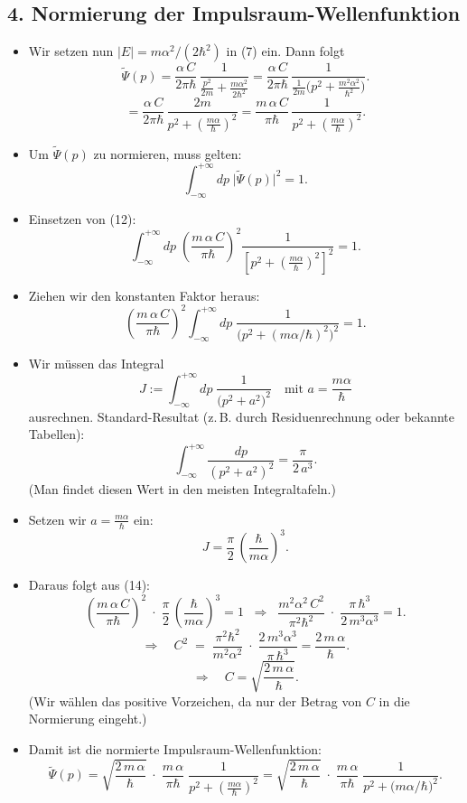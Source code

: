 \documentclass[12pt,a4paper]{scrartcl}
\begin{document}
\subsection*{4. Normierung der Impulsraum-Wellenfunktion}

\begin{itemize}
  \item Wir setzen nun $|E| = m\alpha^2/(2\hbar^2)$ in (7) ein. Dann folgt
  \[
    \widetilde\Psi(p) 
    = \frac{\alpha\,C}{2\pi\hbar}\,\frac{1}{\frac{p^2}{2m} + \frac{m\alpha^2}{2\hbar^2}}
    = \frac{\alpha\,C}{2\pi\hbar}\,\frac{1}{\frac{1}{2m}\bigl(p^2 + \tfrac{m^2\alpha^2}{\hbar^2}\bigr)}.
  \]
  \[
    = \frac{\alpha\,C}{2\pi\hbar}\,\frac{2m}{p^2 + \left(\frac{m\alpha}{\hbar}\right)^2}
    = \frac{m\,\alpha\,C}{\pi\hbar}\,\frac{1}{p^2 + \left(\frac{m\alpha}{\hbar}\right)^2}.
    \tag{12}
  \]
  \item Um $\widetilde\Psi(p)$ zu normieren, muss gelten:
  \[
    \int_{-\infty}^{+\infty} dp\; \bigl|\widetilde\Psi(p)\bigr|^2 = 1.
    \tag{13}
  \]
  \item Einsetzen von (12):
  \[
    \int_{-\infty}^{+\infty} dp\; 
    \left( \frac{m\,\alpha\,C}{\pi\hbar} \right)^2
    \frac{1}{\left[p^2 + \left(\frac{m\alpha}{\hbar}\right)^2\right]^2} 
    = 1.
  \]
  \item Ziehen wir den konstanten Faktor heraus:
  \[
    \left(\frac{m\,\alpha\,C}{\pi\hbar}\right)^2 
    \int_{-\infty}^{+\infty} dp\;\frac{1}{\bigl(p^2 + (m\alpha/\hbar)^2\bigr)^2} 
    = 1.
    \tag{14}
  \]
  \item Wir müssen das Integral
  \[
    J := \int_{-\infty}^{+\infty} dp\;\frac{1}{\bigl(p^2 + a^2\bigr)^2} 
    \quad\text{mit }a=\frac{m\alpha}{\hbar}
  \]
  ausrechnen. Standard-Resultat (z.\,B. durch Residuenrechnung oder bekannte Tabellen):
  \[
    \int_{-\infty}^{+\infty} \frac{dp}{(p^2 + a^2)^2} = \frac{\pi}{2\,a^3}.
  \]
  (Man findet diesen Wert in den meisten Integraltafeln.)
  \item Setzen wir $a = \frac{m\alpha}{\hbar}$ ein:
  \[
    J = \frac{\pi}{2}\,\left(\frac{\hbar}{m\alpha}\right)^3.
    \tag{15}
  \]
  \item Daraus folgt aus (14):
  \[
    \left(\frac{m\,\alpha\,C}{\pi\hbar}\right)^2 \;\cdot\; \frac{\pi}{2}\,\left(\frac{\hbar}{m\alpha}\right)^3 = 1
    \;\;\Longrightarrow\;\;
    \frac{m^2\alpha^2\,C^2}{\pi^2\hbar^2} \;\cdot\; \frac{\pi\,\hbar^3}{2\,m^3\alpha^3} = 1.
  \]
  \[
    \Longrightarrow\quad 
    C^2 \;=\; \frac{\pi^2\hbar^2}{m^2\alpha^2} \;\cdot\; \frac{2\,m^3\alpha^3}{\pi\,\hbar^3}
    = \frac{2\,m\,\alpha}{\hbar}.
  \]
  \[
    \Longrightarrow\quad 
    C = \sqrt{\frac{2\,m\,\alpha}{\hbar}}.
  \]
  (Wir wählen das positive Vorzeichen, da nur der Betrag von $C$ in die Normierung eingeht.)
  \item Damit ist die normierte Impulsraum-Wellenfunktion:
  \[
    \boxed{
      \widetilde\Psi(p)
      = \sqrt{\frac{2\,m\,\alpha}{\hbar}}\;\cdot\;\frac{m\,\alpha}{\pi\hbar}\;\frac{1}{p^2 + \left(\frac{m\alpha}{\hbar}\right)^2}
      = \sqrt{\frac{2\,m\,\alpha}{\hbar}}\;\cdot\;\frac{m\,\alpha}{\pi\hbar}\;\frac{1}{p^2 + \bigl(m\alpha/\hbar\bigr)^2}.
    }
    \tag{16}
  \]
\end{itemize}
\end{document}
